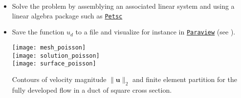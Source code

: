 \begin{itemize}
\item Solve the problem by assemblying an associated linear system and using
a linear algebra package such as
\href{https://petsc.org/release/}{\texttt{Petsc}}
\vspace{-0.5cm}
\begin{center}
\begin{minipage}{1.0\textwidth}
    
\end{minipage}
\end{center}

\item Save the function $u_d$ to a file and visualize for instance
in \href{https://www.paraview.org/}{\texttt{Paraview}}
(see ).
\begin{marginfigure}[-2.25cm]
\begin{center}
\texttt{[image: mesh\_poisson]} \\
\texttt{[image: solution\_poisson]} \\
\texttt{[image: surface\_poisson]}
\caption[]{Contours of velocity magnitude $\lVert \textbf{u} \rVert_2$ and finite element partition for the
fully developed flow in a duct of square cross section.} 
\end{center}
\end{marginfigure}

\end{itemize}


